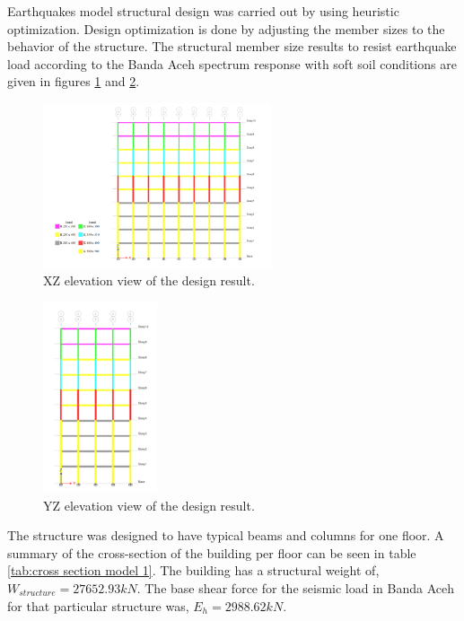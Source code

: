\documentclass{cup-pan}
\begin{document}
Earthquakes model structural design was carried out by using heuristic optimization. Design optimization is done by adjusting the member sizes to the behavior of the structure. The structural member size results to resist earthquake load according to the Banda Aceh spectrum response with soft soil conditions are given in figures \ref{fig:XZ view} and \ref{fig:YZ view}.

\begin{figure}[H]
\centering
\includegraphics[width=0.6\textwidth]{Picture6.png}
\caption{XZ elevation view of the design result.}
\label{fig:XZ view}
\end{figure}

\begin{figure}[H]
\centering
\includegraphics[width=0.3\textwidth]{Picture7.png}
\caption{YZ elevation view of the design result.}
\label{fig:YZ view}
\end{figure}

The structure was designed to have typical beams and columns for one floor. A summary of the cross-section of the building per floor can be seen in table \ref{tab:cross section model 1}. The building has a structural weight of, $W_{structure}=\num{27652,93} \si{kN}$. The base shear force for the seismic load in Banda Aceh for that particular structure was, $E_h=\num{2988,62} \si{kN}$.
\end{document}
